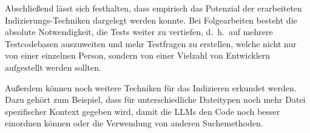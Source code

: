 \documentclass[../main.tex]{subfiles}
\begin{document}
Abschließend lässt sich festhalten, dass empirisch das Potenzial der erarbeiteten Indizierungs-Techniken dargelegt werden konnte.
Bei Folgearbeiten besteht die absolute Notwendigkeit, die Tests weiter zu vertiefen, d.\ h.\ auf mehrere Testcodebasen auszuweiten und mehr Testfragen zu erstellen, welche nicht nur von einer einzelnen Person, sondern von einer Vielzahl von Entwicklern aufgestellt werden sollten.

Außerdem können noch weitere Techniken für das Indizieren erkundet werden.
Dazu gehört zum Beispiel, dass für unterschiedliche Dateitypen noch mehr Datei spezifischer Kontext gegeben wird, damit die \glspl{LLM} den Code noch besser einordnen können oder die Verwendung von anderen Suchemethoden.
\end{document}
